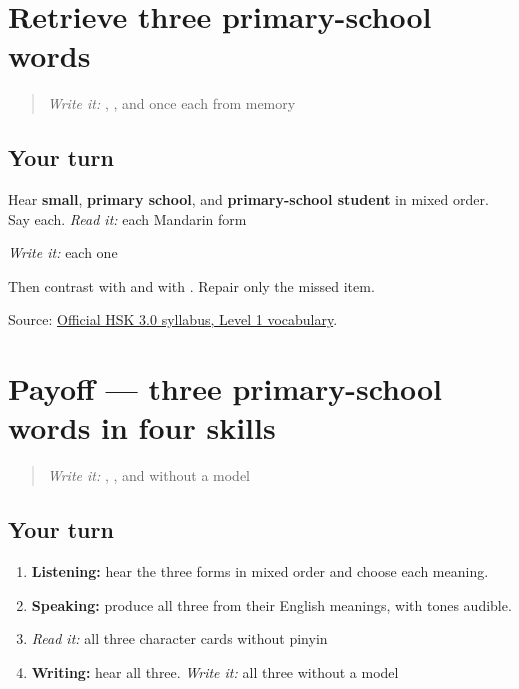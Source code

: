 \section[Practice]{Retrieve three primary-school words}

\label{lesson:ZH-R14-primary-three}



\begin{quote}
\emph{Write it:} , , and  once each from memory
\end{quote}

\subsection*{Your turn}
Hear \textbf{small}, \textbf{primary school}, and \textbf{primary-school student} in mixed order. Say each. \emph{Read it:} each Mandarin form

\emph{Write it:} each one

Then contrast  with  and  with . Repair only the missed item.

\begin{tcolorbox}[breakable,colback=teal!4,colframe=teal!35!black,title={Before you move on}]
Source: \href{https://hsk.cn-bj.ufileos.com/3.0/\%E6\%96\%B0\%E7\%89\%88HSK\%E8\%80\%83\%E8\%AF\%95\%E5\%A4\%A7\%E7\%BA\%B21219.pdf}{Official HSK 3.0 syllabus, Level 1 vocabulary}.
\end{tcolorbox}
\section[Practice]{Payoff — three primary-school words in four skills}

\label{lesson:ZH-C14-practice}



\begin{quote}
\emph{Write it:} , , and  without a model
\end{quote}

\subsection*{Your turn}
\begin{enumerate}
\raggedright
  \item \textbf{Listening:} hear the three forms in mixed order and choose each meaning.
  \item \textbf{Speaking:} produce all three from their English meanings, with tones audible.
  \item \emph{Read it:} all three character cards without pinyin
  \item \textbf{Writing:} hear all three. \emph{Write it:} all three without a model
\end{enumerate}

